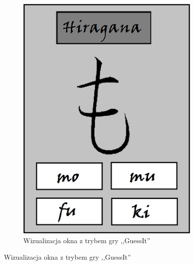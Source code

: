 \documentclass[15pt]{article}
\begin{document}
\begin{figure}[h!]
\begin{subfigure}[b]{0.35\linewidth}
    \includegraphics[width=\linewidth]{guess.png}
    \caption{Wizualizacja okna z trybem gry ,,GuessIt''}
  \end{subfigure}
  
  \label{fig:coffee}
\end{figure}
\end{document}
